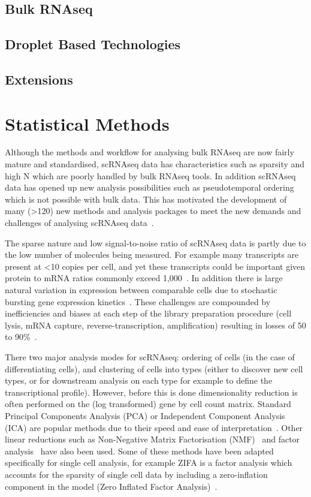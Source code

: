 \subsection{Bulk RNAseq}


\subsection{Droplet Based Technologies}

\subsection{Extensions}

\section{Statistical Methods}

Although the methods and workflow for analysing bulk RNAseq are now fairly mature and standardised, scRNAseq data has characteristics such as sparsity and high N which are poorly handled by bulk RNAseq tools. In addition scRNAseq data has opened up new analysis possibilities such as pseudotemporal ordering which is not possible with bulk data. This has motivated the development of many (\textgreater 120) new methods and analysis packages to meet the new demands and challenges of analysing scRNAseq data~\cite{Zappia2017ScRNAtools}.

The sparse nature and low signal-to-noise ratio of scRNAseq data is partly due to the low number of molecules being measured. For example many transcripts are present at \textless 10 copies per cell, and yet these transcripts could be important given protein to mRNA ratios commonly exceed 1,000~\cite{Lahtvee2017Absolute,Marguerat2012Quantitative}. In addition there is large natural variation in expression between comparable cells due to stochastic bursting gene expression kinetics~\cite{Raj2006Stochastic}. These challenges are compounded by inefficiencies and biases at each step of the library preparation procedure (cell lysis, mRNA capture, reverse-transcription, amplification) resulting in losses of 50 to 90\%~\cite{Islam2012Highly}.

There two major analysis modes for scRNAseq: ordering of cells (in the case of differentiating cells), and clustering of cells into types (either to discover new cell types, or for downstream analysis on each type for example to define the transcriptional profile). However, before this is done dimensionality reduction is often performed on the (log transformed) gene by cell count matrix. Standard Principal Components Analysis (PCA) or Independent Component Analysis (ICA) are popular methods due to their speed and ease of interpretation~\cite{Satija2015Spatial,Trapnell2014Dynamics}. Other linear reductions such as Non-Negative Matrix Factorisation (NMF)~\cite{Shao2017Robust} and factor analysis~\cite{Buettner2015Computational} have also been used. Some of these methods have been adapted specifically for single cell analysis, for example ZIFA is a factor analysis which accounts for the sparsity of single cell data by including a zero-inflation component in the model (Zero Inflated Factor Analysis)~\cite{Pierson2015ZIFA}.

